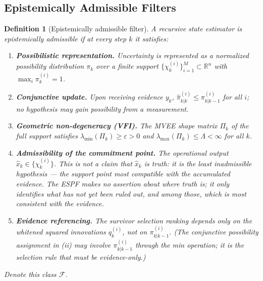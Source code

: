 \documentclass[12pt]{article}
\newtheorem{definition}[theorem]{Definition}
\begin{document}
\subsection{Epistemically Admissible Filters}

\begin{definition}[Epistemically admissible filter]
A recursive state estimator is \emph{epistemically admissible} if at every step $k$ it satisfies:
\begin{enumerate}
\item[(i)] \textbf{Possibilistic representation.} Uncertainty is represented as a normalized possibility distribution $\pi_k$ over a finite support $\{\chi^{(i)}_k\}^M_{i=1} \subset \mathbb{R}^n$ with $\max_i \pi^{(i)}_k = 1$.
\item[(ii)] \textbf{Conjunctive update.} Upon receiving evidence $y_k$, $\hat{\pi}^{(i)}_{k|k} \leq \pi^{(i)}_{k|k-1}$ for all $i$; no hypothesis may gain possibility from a measurement.
\item[(iii)] \textbf{Geometric non-degeneracy (VFI).} The MVEE shape matrix $\Pi_k$ of the full support satisfies $\lambda_{\min}(\Pi_k) \geq \varepsilon > 0$ and $\lambda_{\max}(\Pi_k) \leq \Lambda < \infty$ for all $k$.
\item[(iv)] \textbf{Admissibility of the commitment point.} The operational output $\hat{x}_k \in \{\chi^{(i)}_k\}$. This is not a claim that $\hat{x}_k$ is truth: it is the least inadmissible hypothesis --- the support point most compatible with the accumulated evidence. The ESPF makes no assertion about where truth is; it only identifies what has not yet been ruled out, and among those, which is most consistent with the evidence.
\item[(v)] \textbf{Evidence referencing.} The survivor selection ranking depends only on the whitened squared innovations $q^{(i)}_k$, not on $\pi^{(i)}_{k|k-1}$. (The conjunctive possibility assignment in (ii) may involve $\pi^{(i)}_{k|k-1}$ through the min operation; it is the selection rule that must be evidence-only.)
\end{enumerate}
Denote this class $\mathcal{F}$.
\end{definition}
\end{document}
